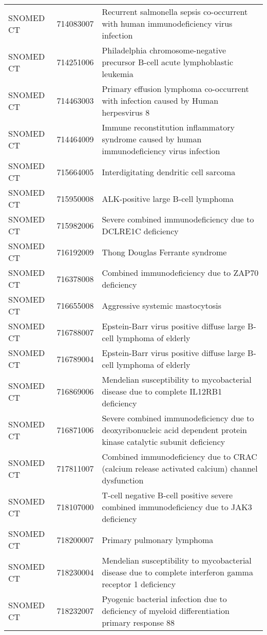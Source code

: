 \begin{table}[ht]
\begin{tabular}{lll}
  SNOMED CT & 714083007 & Recurrent salmonella sepsis co-occurrent with human immunodeficiency virus infection \\ 
  SNOMED CT & 714251006 & Philadelphia chromosome-negative precursor B-cell acute lymphoblastic leukemia \\ 
  SNOMED CT & 714463003 & Primary effusion lymphoma co-occurrent with infection caused by Human herpesvirus 8 \\ 
  SNOMED CT & 714464009 & Immune reconstitution inflammatory syndrome caused by human immunodeficiency virus infection \\ 
  SNOMED CT & 715664005 & Interdigitating dendritic cell sarcoma \\ 
  SNOMED CT & 715950008 & ALK-positive large B-cell lymphoma \\ 
  SNOMED CT & 715982006 & Severe combined immunodeficiency due to DCLRE1C deficiency \\ 
  SNOMED CT & 716192009 & Thong Douglas Ferrante syndrome \\ 
  SNOMED CT & 716378008 & Combined immunodeficiency due to ZAP70 deficiency \\ 
  SNOMED CT & 716655008 & Aggressive systemic mastocytosis \\ 
  SNOMED CT & 716788007 & Epstein-Barr virus positive diffuse large B-cell lymphoma of elderly \\ 
  SNOMED CT & 716789004 & Epstein-Barr virus positive diffuse large B-cell lymphoma of elderly \\ 
  SNOMED CT & 716869006 & Mendelian susceptibility to mycobacterial disease due to complete IL12RB1 deficiency \\ 
  SNOMED CT & 716871006 & Severe combined immunodeficiency due to deoxyribonucleic acid dependent protein kinase catalytic subunit deficiency \\ 
  SNOMED CT & 717811007 & Combined immunodeficiency due to CRAC (calcium release activated calcium) channel dysfunction \\ 
  SNOMED CT & 718107000 & T-cell negative B-cell positive severe combined immunodeficiency due to JAK3 deficiency \\ 
  SNOMED CT & 718200007 & Primary pulmonary lymphoma \\ 
  SNOMED CT & 718230004 & Mendelian susceptibility to mycobacterial disease due to complete interferon gamma receptor 1 deficiency \\ 
  SNOMED CT & 718232007 & Pyogenic bacterial infection due to deficiency of myeloid differentiation primary response 88 \\ 

\end{tabular}
\end{table}

